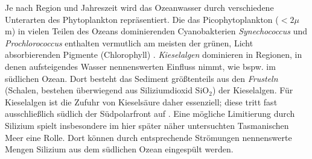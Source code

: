 \documentclass[12pt,a4paper,onecolumn]{scrartcl}
\begin{document}
Je nach Region und Jahreszeit wird das Ozeanwasser durch verschiedene Unterarten des Phytoplankton repräsentiert. Die das Picophytoplankton ($<2\mu$m) in vielen Teilen des Ozeans dominierenden Cyanobakterien \textit{Synechococcus} und \textit{Prochlorococcus} enthalten vermutlich am meisten der grünen, Licht absorbierenden Pigmente (Chlorophyll) \citep{Emerson.2009}. \textit{Kieselalgen} dominieren in Regionen, in denen aufsteigendes Wasser nennenswerten Einfluss nimmt, wie bspw. im südlichen Ozean. Dort besteht das Sediment größtenteils aus den \textit{Frusteln} (Schalen, bestehen überwiegend aus Siliziumdioxid SiO$_2$) der Kieselalgen. Für Kieselalgen ist die Zufuhr von Kieselsäure daher essenziell; diese tritt fast ausschließlich südlich der Südpolarfront auf \citep{Falkowski.1998}. Eine mögliche Limitierung durch Silizium spielt insbesondere im  hier später näher untersuchten Tasmanischen Meer eine Rolle. Dort können durch entsprechende Strömungen nennenswerte Mengen Silizium aus dem südlichen Ozean eingespült werden.
\end{document}
